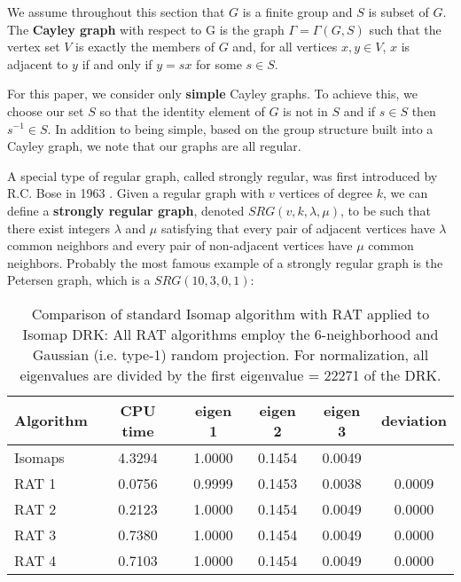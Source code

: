 We assume throughout this section that $G$ is a finite group and $S$ is subset of $G$. The \textbf{Cayley graph} with respect to G is the graph $\Gamma = \Gamma (G,S)$ such that the vertex set $V$ is exactly the members of $G$ and, for all vertices $x,y\in V$,  $x$ is adjacent to $y$ if and only if $y = sx$ for some $s\in S$.

For this paper, we consider only \textbf{simple} Cayley graphs. To achieve this, we choose our set $S$ so that the identity element of $G$ is not in $S$ and if $s\in S$ then $s^{-1}\in S$. In addition to being simple, based on the group structure built into a Cayley graph, we note that our graphs are all regular.

A special type of regular graph, called strongly regular, was first introduced by  R.C. Bose in 1963 \cite{BCN}. Given a regular graph with $v$ vertices of degree $k$, we can define a \textbf{strongly regular graph}, denoted $SRG(v,k,\lambda, \mu)$, to be such that there exist integers $\lambda$ and $\mu$ satisfying that every pair of adjacent vertices have $\lambda$ common neighbors and every pair of non-adjacent vertices have $\mu$ common neighbors. Probably the most famous example of a strongly regular graph is the Petersen graph, which is a $SRG(10,3,0,1)$:

\begin{table}[htb]
\begin{center}
\begin{tabular}
[c]{|l|c|c|c|c|c|}\hline
Algorithm & CPU time & eigen 1 & eigen 2 & eigen 3 &  deviation   \\ \hline
Isomaps &  4.3294  & 1.0000  & 0.1454  & 0.0049  &    \\ \hline
RAT          1 &  0.0756  & 0.9999  & 0.1453  & 0.0038  & 0.0009   \\ \hline
RAT          2 &  0.2123  & 1.0000  & 0.1454  & 0.0049  & 0.0000   \\ \hline
RAT          3 &  0.7380  & 1.0000  & 0.1454  & 0.0049  & 0.0000   \\ \hline
RAT          4 &  0.7103  & 1.0000  & 0.1454  & 0.0049  & 0.0000   \\ \hline
\end{tabular}
\caption{\small{Comparison of standard Isomap algorithm with RAT applied to Isomap DRK: All RAT algorithms employ the $6$-neighborhood and Gaussian (i.e. type-1) random projection. For normalization, all eigenvalues are divided by the first eigenvalue = 22271 of the DRK.}}
\end{center}
 \label{Tbl3}
\end{table}

